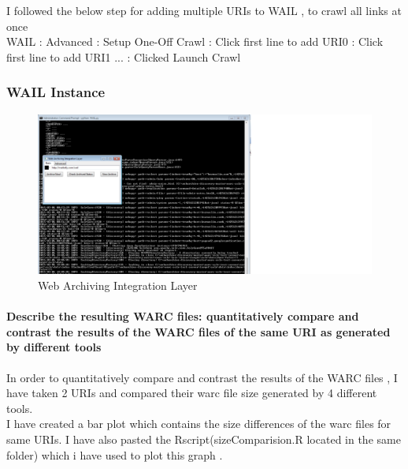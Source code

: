 \documentclass[12pt]{Report}
\begin{document}
I followed the below step for adding multiple URIs to WAIL , to crawl all links at once \\

WAIL : Advanced : Setup One-Off Crawl : Click first line to add URI0  : Click first line to add URI1 ... : Clicked Launch Crawl \\


\subsubsection{WAIL Instance}
\begin{figure}[ht]    
    \begin{center}
        \includegraphics[scale=0.60]{wailinstance.png}
        \caption{Web Archiving Integration Layer }
        \label{warc file size comparision}
    \end{center}
\end{figure}
\newpage



\paragraph{Describe the resulting WARC files: quantitatively compare and contrast the results of the WARC files of the same URI as generated by different tools }

In order to quantitatively compare and contrast the results of the WARC files , I have taken 2 URIs and compared their warc file size generated by 4 different tools. \\
I have created a bar plot which contains the size differences of the warc files for same URIs. I have also pasted the Rscript(sizeComparision.R located in the same folder) which i have used to plot this graph . 
 


\newpage
\end{document}
